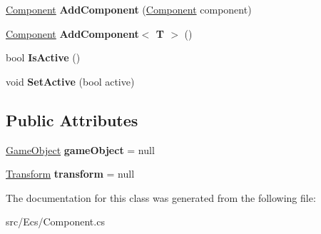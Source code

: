 \begin{DoxyCompactItemize}
\mbox{\hyperlink{class_ecs_1_1_component}{Component}} {\bfseries Add\+Component} (\mbox{\hyperlink{class_ecs_1_1_component}{Component}} component)
\item 
\mbox{\label{class_ecs_1_1_component_a6a34a62ab59f8f15ae015d7526682c32}} 
\mbox{\hyperlink{class_ecs_1_1_component}{Component}} {\bfseries Add\+Component$<$ T $>$} ()
\item 
\mbox{\label{class_ecs_1_1_component_ab9256d060b3c50c44b53d1b37c27eeac}} 
bool {\bfseries Is\+Active} ()
\item 
\mbox{\label{class_ecs_1_1_component_a8b3f556d3c3318f2df4bb0062a5a40e3}} 
void {\bfseries Set\+Active} (bool active)
\end{DoxyCompactItemize}
\subsection*{Public Attributes}
\begin{DoxyCompactItemize}
\item 
\mbox{\label{class_ecs_1_1_component_a07e9056497ace18a151c4ae9e2938798}} 
\mbox{\hyperlink{class_ecs_1_1_game_object}{Game\+Object}} {\bfseries game\+Object} = null
\item 
\mbox{\label{class_ecs_1_1_component_a13b68c9cce3ae3fd514dcedc1edd595a}} 
\mbox{\hyperlink{class_ecs_1_1_transform}{Transform}} {\bfseries transform} = null
\end{DoxyCompactItemize}


The documentation for this class was generated from the following file\+:\begin{DoxyCompactItemize}
\item 
src/\+Ecs/Component.\+cs\end{DoxyCompactItemize}

